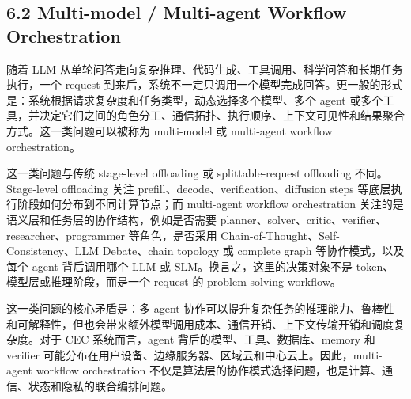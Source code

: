 \documentclass[a4paper,10pt]{ctexart}
\begin{document}
\subsection*{6.2 Multi-model / Multi-agent Workflow Orchestration}

随着 LLM 从单轮问答走向复杂推理、代码生成、工具调用、科学问答和长期任务执行，一个 request 到来后，系统不一定只调用一个模型完成回答。更一般的形式是：系统根据请求复杂度和任务类型，动态选择多个模型、多个 agent 或多个工具，并决定它们之间的角色分工、通信拓扑、执行顺序、上下文可见性和结果聚合方式。这一类问题可以被称为 multi-model 或 multi-agent workflow orchestration。


这一类问题与传统 stage-level offloading 或 splittable-request offloading 不同。Stage-level offloading 关注 prefill、decode、verification、diffusion steps 等底层执行阶段如何分布到不同计算节点；而 multi-agent workflow orchestration 关注的是语义层和任务层的协作结构，例如是否需要 planner、solver、critic、verifier、researcher、programmer 等角色，是否采用 Chain-of-Thought、Self-Consistency、LLM Debate、chain topology 或 complete graph 等协作模式，以及每个 agent 背后调用哪个 LLM 或 SLM。换言之，这里的决策对象不是 token、模型层或推理阶段，而是一个 request 的 problem-solving workflow。


这一类问题的核心矛盾是：多 agent 协作可以提升复杂任务的推理能力、鲁棒性和可解释性，但也会带来额外模型调用成本、通信开销、上下文传输开销和调度复杂度。对于 CEC 系统而言，agent 背后的模型、工具、数据库、memory 和 verifier 可能分布在用户设备、边缘服务器、区域云和中心云上。因此，multi-agent workflow orchestration 不仅是算法层的协作模式选择问题，也是计算、通信、状态和隐私的联合编排问题。
\end{document}
